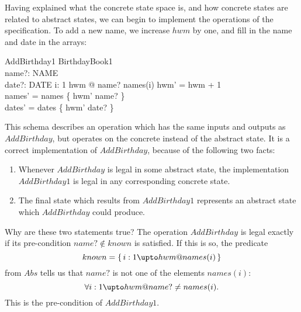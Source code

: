 Having explained what the concrete state space is, and how concrete
states are related to abstract states, we can begin to implement the
operations of the specification.  To add a new name, we increase
$hwm$ by one, and fill in the name and date in the arrays:
\begin{schema}{AddBirthday1}
	\Delta BirthdayBook1 \\
	name?: NAME \\
	date?: DATE
\where
	\forall i: 1 \upto hwm @ name? \neq names(i)
\also
	hwm' = hwm + 1 \\
	names' = names \oplus \{ hwm' \mapsto name? \} \\
	dates' = dates \oplus \{ hwm' \mapsto date? \}
\end{schema}
This schema describes an operation which has the same inputs and
outputs as $AddBirthday$, but operates on the concrete instead of the abstract
state. It is a correct implementation of $AddBirthday$, because of the
following two facts:
\begin{enumerate}
\item	Whenever $AddBirthday$ is legal in some abstract state,
	the implementation $AddBirthday1$ is legal in any corresponding
	concrete state.
\item	The final state which results from $AddBirthday1$ represents
	an abstract state which $AddBirthday$ could produce.
\end{enumerate}
Why are these two statements true?  
The operation $AddBirthday$ is legal exactly if its pre-condition
$name? \notin known$ is satisfied.  If this is so, the predicate
\[ known = \{\,i: 1 \upto hwm @ names(i)\,\} \]
from $Abs$ tells us that $name?$ is not one of the elements $names(i)$:
\[ \forall i: 1 \upto hwm @ name? \neq names(i). \]
This is the pre-condition of $AddBirthday1$.

